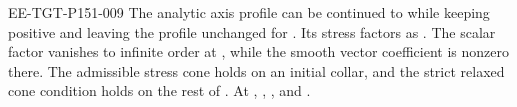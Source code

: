\begin{proposition}\label{prop:B.5}
\begin{EESegment}{EE-TGT-P151-009}
The analytic axis profile can be continued to  while keeping
 positive and leaving the profile unchanged for
. Its stress factors as
. The scalar factor  vanishes to
infinite order at , while the smooth vector coefficient
 is nonzero there. The admissible stress cone holds on an initial collar,
and the strict relaxed cone condition holds on the rest of
\NSi{NS-F-P151-046}{(X_0,X_i]}. At ,
, , and
.
\end{EESegment}
\end{proposition}
